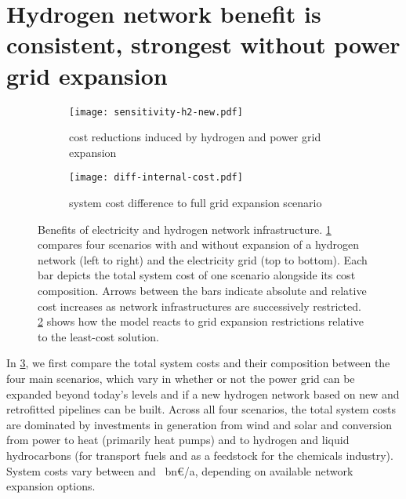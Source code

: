 \section*{Hydrogen network benefit is consistent, strongest without power grid expansion}
\label{sec:h2}


\begin{figure}
    \centering
    \begin{subfigure}[t]{\textwidth}
        \centering
        \caption{cost reductions induced by hydrogen and power grid expansion}
        \texttt{[image: sensitivity-h2-new.pdf]}
        \label{fig:sensitivity-h2-a}
    \end{subfigure}
    \begin{subfigure}[t]{\textwidth}
        \centering
        \caption{system cost difference to full grid expansion scenario}
        \texttt{[image: diff-internal-cost.pdf]}
        \label{fig:sensitivity-h2-b}
    \end{subfigure}
    \caption{Benefits of electricity and hydrogen network infrastructure.
    \cref{fig:sensitivity-h2-a} compares four scenarios with and without
    expansion of a hydrogen network (left to right) and the electricity grid
    (top to bottom). Each bar depicts the total system cost of one scenario
    alongside its cost composition. Arrows between the bars indicate absolute
    and relative cost increases as network infrastructures are successively
    restricted. \cref{fig:sensitivity-h2-b} shows how the model reacts to grid
    expansion restrictions relative to the least-cost solution.}
    \label{fig:sensitivity-h2}
\end{figure}

In \cref{fig:sensitivity-h2}, we first compare the total system costs and their
composition between the four main scenarios, which vary in whether or not the
power grid can be expanded beyond today's levels and if a new hydrogen network
based on new and retrofitted pipelines can be built. Across all four scenarios,
the total system costs are dominated by investments in generation from wind and
solar and conversion from power to heat (primarily heat pumps) and to hydrogen
and liquid hydrocarbons (for transport fuels and as a feedstock for the
chemicals industry). System costs vary between \minsystemcost and
\maxsystemcost~bn\euro/a, depending on available network expansion options.

